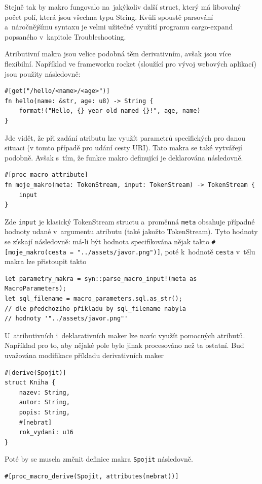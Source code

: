 \documentclass[a4paper, 12pt, twoside]{article} %
\newcommand{\rust}[1]{\texttt{#1}}
\begin{document}
			Stejně tak by makro fungovalo na~jakýkoliv další struct, který má libovolný počet polí, která jsou všechna typu String. Kvůli spoustě parsování a~náročnějšímu syntaxu je velmi užitečné využití programu cargo-expand popsaného v~kapitole Troubleshooting.
			
			Atributivní makra jsou velice podobná těm derivativním, avšak jsou více flexibilní. Například ve frameworku rocket (sloužící pro vývoj webových aplikací) jsou použity následovně: 
			\begin{verbatim}
#[get("/hello/<name>/<age>")]
fn hello(name: &str, age: u8) -> String {
	format!("Hello, {} year old named {}!", age, name)
}
			\end{verbatim}
			\cite{rocket}
			
			Jde vidět, že při zadání atributu lze využít parametrů specifických pro danou situaci (v tomto případě pro udání cesty URI). Tato makra se také vytvářejí podobně. Avšak s~tím, že funkce makro definující je deklarována následovně.
			\begin{verbatim}
#[proc_macro_attribute]
fn moje_makro(meta: TokenStream, input: TokenStream) -> TokenStream {
	input
} 
			\end{verbatim}
			
			Zde \rust{input} je klasický TokenStream structu a~proměnná \rust{meta} obsahuje případné hodnoty udané v~argumentu atributu (také jakožto TokenStream). Tyto hodnoty se získají následovně: má-li být hodnota specifikována nějak takto \linebreak\texttt{\#[moje\_makro(cesta = "../assets/javor.png")]}, poté k~hodnotě \rust{cesta} v~tělu makra lze přistoupit takto
			\begin{verbatim}
let parametry_makra = syn::parse_macro_input!(meta as MacroParameters);
let sql_filename = macro_parameters.sql.as_str();
// dle předchozího příkladu by sql_filename nabyla
// hodnoty '"../assets/javor.png"'
			\end{verbatim}
			\cite{atrib_makro}
			
			U~atributivních i~deklarativních maker lze navíc využít pomocných atributů. Například pro to, aby nějaké pole bylo jinak procesováno než ta ostatní. Buď uvažována modifikace příkladu derivativních maker
			\begin{verbatim}
#[derive(Spojit)]
struct Kniha {
	nazev: String,
	autor: String,
	popis: String,
	#[nebrat]
	rok_vydani: u16
}
			\end{verbatim}
			
			
			Poté by se musela změnit definice makra \texttt{Spojit} následovně.
			\begin{verbatim}
#[proc_macro_derive(Spojit, attributes(nebrat))]
			\end{verbatim}
			
\end{document}
